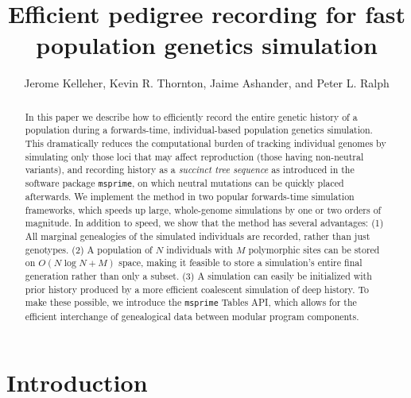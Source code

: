 \documentclass{article}
\newcommand{\msprime}{\texttt{msprime}}
\begin{document}
\title{Efficient pedigree recording for fast population genetics simulation}
\author{Jerome Kelleher,
        Kevin R. Thornton,
        Jaime Ashander, and
        Peter L. Ralph}
\maketitle



\begin{abstract}
    In this paper we describe how to
    efficiently record the entire genetic history of a population
    during a forwards-time, individual-based population genetics simulation.
    This dramatically reduces the computational burden of tracking individual genomes
    by simulating only those loci that may affect reproduction (those having non-neutral variants),
    and recording history as a \emph{succinct tree sequence} as introduced in the software package \msprime,
    on which neutral mutations can be quickly placed afterwards.
    We implement the method in two popular forwards-time simulation frameworks,
    which speeds up large, whole-genome simulations by one or two orders of magnitude.
    In addition to speed, we show that the method has several advantages:
    (1) All marginal genealogies of the simulated individuals are recorded, rather than just genotypes.
    (2) A population of $N$ individuals with $M$ polymorphic sites
    can be stored on $O(N \log N + M)$ space, making it feasible to store a simulation's entire final generation
    rather than only a subset.
    (3) A simulation can easily be initialized with prior history produced by a more efficient coalescent simulation of deep history.
    To make these possible,
    we introduce the \msprime{} Tables API, which allows for the efficient interchange of genealogical data between modular program components.
\end{abstract}



\section*{Introduction}
\end{document}
